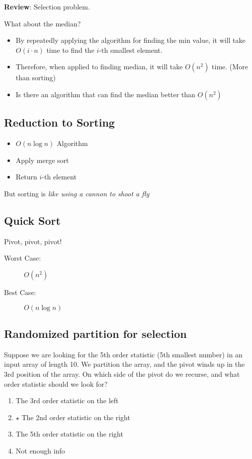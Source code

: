 \documentclass{article}
\begin{document}
\textbf{Review}: Selection problem.

What about the median?

\begin{itemize}
    \item By repeatedly applying the algorithm for finding the min value, it will take \(O(i \cdot n)\) time to find the $i$-th smallest element.
    \item Therefore, when applied to finding median, it will take \(O(n^2)\) time. (More than sorting)
    \item Is there an algorithm that can find the median better than \(O(n^2)\)
\end{itemize}

\subsection*{Reduction to Sorting}
\begin{itemize}
    \item \(O(n \log n)\) Algorithm
    \item Apply merge sort
    \item Return $i$-th element
\end{itemize}

But sorting is \textit{like using a cannon to shoot a fly}

\subsection*{Quick Sort}
Pivot, pivot, pivot!

\begin{description}
    \item[Worst Case:] \(O(n^2)\)
    \item[Best Case:] \(O(n \log n)\)
\end{description}

\subsection*{Randomized partition for selection}
Suppose we are looking for the 5th order statistic (5th smallest number) in an
input array of length 10. We partition the array, and the pivot winds up in the
3rd position of the array. On which side of the pivot do we recurse, and what
order statistic should we look for?

\begin{enumerate}[label=\Alph*:]
    \item The 3rd order statistic on the left
    \item $\star$ The 2nd order statistic on the right
    \item The 5th order statistic on the right
    \item Not enough info
\end{enumerate}
\end{document}
